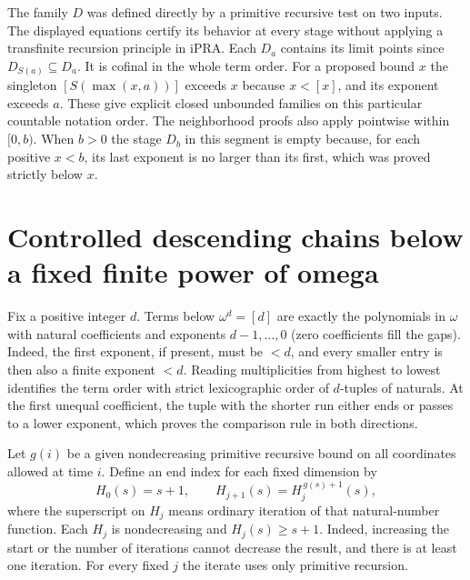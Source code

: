 The family $D$ was defined directly by a primitive recursive test on
two inputs. The displayed equations certify its behavior at every
stage without applying a transfinite recursion principle in iPRA.
Each $D_a$ contains its limit points since $D_{S(a)}\subseteq D_a$.
It is cofinal in the whole term order. For a proposed bound $x$ the
singleton $[S(\max(x,a))]$ exceeds $x$ because $x<[x]$, and its
exponent exceeds $a$. These give explicit closed unbounded families on
this particular countable notation order. The neighborhood proofs also
apply pointwise within $[0,b)$. When $b>0$ the stage $D_b$ in this
segment is empty because, for each positive $x<b$, its last exponent is no
larger than its first, which was proved strictly below $x$.

\section{Controlled descending chains below a fixed finite power of omega}
\label{sec:control}
Fix a positive integer $d$. Terms below $\omega^d=[d]$ are exactly
the polynomials in $\omega$ with natural coefficients and exponents
$d-1,\ldots,0$ (zero coefficients fill the gaps). Indeed, the first
exponent, if present, must be $<d$, and every smaller entry is then
also a finite exponent $<d$. Reading multiplicities from highest to
lowest identifies the term order with strict lexicographic order of
$d$-tuples of naturals. At the first unequal coefficient, the tuple
with the shorter run either ends or passes to a lower exponent, which
proves the comparison rule in both directions.

Let $g(i)$ be a given nondecreasing primitive recursive bound on
all coordinates allowed at time $i$. Define an end index for each
fixed dimension by
\[
 H_0(s)=s+1,\qquad
 H_{j+1}(s)= H_j^{\,g(s)+1}(s),
\]
where the superscript on $H_j$ means ordinary iteration of that
natural-number function. Each $H_j$ is nondecreasing and
$H_j(s)\ge s+1$. Indeed, increasing the
start or the number of iterations cannot decrease the result, and
there is at least one iteration. For every fixed $j$ the iterate
uses only primitive recursion.

